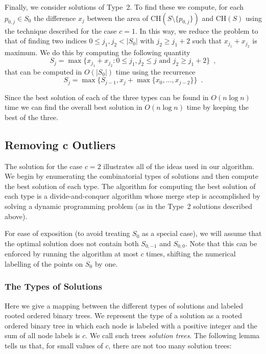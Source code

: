 \documentclass[lotsofwhite]{patmorin}
\newcommand{\ch}{\mathrm{CH}}
\begin{document}
Finally, we consider solutions of Type~2.  To find these we compute,
for each $p_{0,j}\in S_0$ the difference $x_j$ between the area of
$\ch(S\setminus\{p_{0,j}\})$ and $\ch(S)$ using the technique
described for the case $c=1$.  In this way, we reduce the problem to
that of finding two indices $0\le j_1,j_2< |S_0|$ with $j_2\ge j_1+2$
such that $x_{j_1}+x_{j_2}$ is maximum.  We do this by computing the
following quantity
\[
     S_j = \max\{x_{j_1}+x_{j_2} :
       \mbox{$0\le j_1,j_2\le j$ and $j_2 \ge j_1+2$}\} \enspace ,
\]
that can be computed in $O(|S_0|)$ time using the recurrence
\[
    S_j = \max\{S_{j-1}, x_{j} + \max\{x_{0},\ldots,x_{j-2}\}\}
                \enspace .
\]

Since the best solution of each of the three types can be found in
$O(n\log n)$ time we can find the overall best solution in $O(n\log
n)$ time by keeping the best of the three.

\subsection{Removing $\mathbf{c}$ Outliers}

The solution for the case $c=2$ illustrates all of the ideas used in 
our algorithm.  We begin by enumerating the combinatorial types of
solutions and then compute the best solution of each type.  The
algorithm for computing the best solution of each type is a
divide-and-conquer algorithm whose merge step is accomplished by
solving a dynamic programming problem (as in the Type~2 solutions
described above).

For ease of exposition (to avoid treating $S_0$ as a special case), we
will assume that the optimal solution does not contain both $S_{0,-1}$
and $S_{0,0}$.  Note that this can be enforced by running the
algorithm at most $c$ times, shifting the numerical labelling of the
points on $S_0$ by one.

\subsubsection{The Types of Solutions}

Here we give a mapping between the different types of solutions and
labeled rooted ordered binary trees. We represent the type of a
solution as a rooted ordered binary tree in which each node is labeled
with a positive integer and the sum of all node labels is $c$.  We
call such trees \emph{solution trees}.  The following lemma tells us
that, for small values of $c$, there are not too many solution trees:
 
\end{document}
